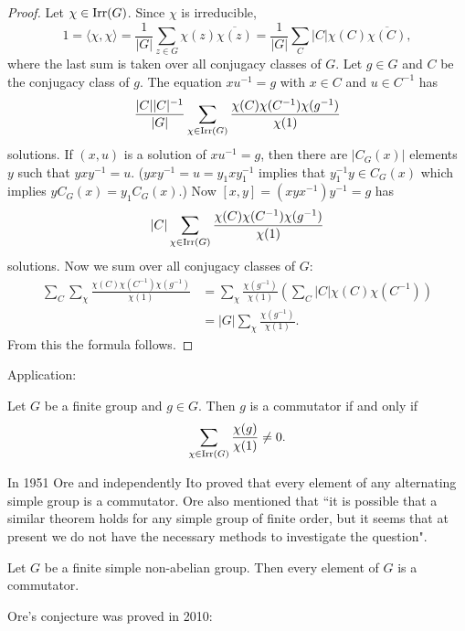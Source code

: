 \begin{proof}
    Let $\chi\in\operatorname{Irr}(G)$. Since $\chi$ is irreducible, 
    \[
    1=\langle\chi,\chi\rangle
    =\frac{1}{|G|}\sum_{z\in G}\chi(z)\overline{\chi(z)}
    =\frac{1}{|G|}\sum_{C}|C|\chi(C)\overline{\chi(C)},
    \]
    where the last sum is taken over all conjugacy classes of $G$. 
    Let $g\in G$ and $C$ be the conjugacy class of $g$. The equation
    $xu^{-1}=g$ with $x\in C$ and $u\in C^{-1}$ has 
    \[
        \frac{|C||C|^{-1}}{|G|}\sum_{\chi\in\operatorname{Irr}(G)}\frac{\chi(C)\chi(C^{-1})\chi(g^{-1})}{\chi(1)}
    \]
    solutions. If $(x,u)$ is a solution of $xu^{-1}=g$, then
    there are $|C_G(x)|$ elements $y$ such that $yxy^{-1}=u$. ($yxy^{-1}=u=y_1xy_1^{-1}$ implies that $y_1^{-1}y\in C_G(x)$ which implies $yC_G(x)=y_1C_G(x)$.) Now 
    $[x,y]=(xyx^{-1})y^{-1}=g$ has 
    \[
    |C|\sum_{\chi\in\operatorname{Irr}(G)}\frac{\chi(C)\chi(C^{-1})\chi(g^{-1})}{\chi(1)}
    \]
    solutions. Now we sum over all conjugacy classes of $G$:
    \begin{align*}
        \sum_{C}\sum_{\chi}\frac{\chi(C)\chi(C^{-1})\chi(g^{-1})}{\chi(1)}
        &=\sum_{\chi}\frac{\chi(g^{-1})}{\chi(1)}\left(\sum_C|C|\chi(C)\chi(C^{-1})\right)\\
        &=|G|\sum_{\chi}\frac{\chi(g^{-1})}{\chi(1)}.
    \end{align*}
    From this the formula follows. 
\end{proof}

Application:

\begin{corollary}
    Let $G$ be a finite group and $g\in G$. Then $g$ 
    is a commutator if and only if 
    \[
    \sum_{\chi\in\operatorname{Irr}(G)}\frac{\chi(g)}{\chi(1)}\ne0.
    \]
\end{corollary}

\label{Ore}

In 1951 Ore and independently Ito
proved that every element of any alternating simple group is a commutator. 
Ore also mentioned that ``it is possible that a similar theorem holds for any simple group of finite order, but it seems that at present we do not have the necessary methods to investigate the question". 

\begin{conjecture}[Ore]
    Let $G$ be a finite simple non-abelian group. 
    Then every element of $G$ is a commutator. 
\end{conjecture}

Ore's conjecture was proved in 2010:

